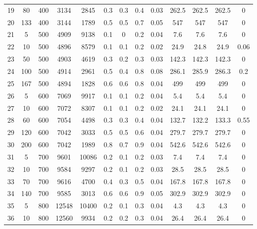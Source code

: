 \documentclass[11pt]{article}
\newcommand{\np}{\newpage}
\begin{document}
\begin{appendices}
\begin{landscape}
\begin{longtable}[c]{ccccc|cccc|cccc}
				19 & 80  & 400 & 3134  & 2845  & 0.3 & 0.3 & 0.4 & 0.03 & 262.5 & 262.5 & 262.5 & 0    \\
				20 & 133 & 400 & 3144  & 1789  & 0.5 & 0.5 & 0.7 & 0.05 & 547   & 547   & 547   & 0    \\ 
				\np
				\rowcolor[HTML]{EFEFEF} 
				21 & 5   & 500 & 4909  & 9138  & 0.1 & 0   & 0.2 & 0.04 & 7.6   & 7.6   & 7.6   & 0    \\
				\rowcolor[HTML]{EFEFEF} 
				22 & 10  & 500 & 4896  & 8579  & 0.1 & 0.1 & 0.2 & 0.02 & 24.9  & 24.8  & 24.9  & 0.06 \\
				\rowcolor[HTML]{EFEFEF} 
				23 & 50  & 500 & 4903  & 4619  & 0.3 & 0.2 & 0.3 & 0.03 & 142.3 & 142.3 & 142.3 & 0    \\
				\rowcolor[HTML]{EFEFEF} 
				24 & 100 & 500 & 4914  & 2961  & 0.5 & 0.4 & 0.8 & 0.08 & 286.1 & 285.9 & 286.3 & 0.2  \\
				\rowcolor[HTML]{EFEFEF} 
				25 & 167 & 500 & 4894  & 1828  & 0.6 & 0.6 & 0.8 & 0.04 & 499   & 499   & 499   & 0    \\
				26 & 5   & 600 & 7069  & 9917  & 0.1 & 0.1 & 0.2 & 0.04 & 5.4   & 5.4   & 5.4   & 0    \\
				27 & 10  & 600 & 7072  & 8307  & 0.1 & 0.1 & 0.2 & 0.02 & 24.1  & 24.1  & 24.1  & 0    \\
				28 & 60  & 600 & 7054  & 4498  & 0.3 & 0.3 & 0.4 & 0.04 & 132.7 & 132.2 & 133.3 & 0.55 \\
				29 & 120 & 600 & 7042  & 3033  & 0.5 & 0.5 & 0.6 & 0.04 & 279.7 & 279.7 & 279.7 & 0    \\
				30 & 200 & 600 & 7042  & 1989  & 0.8 & 0.7 & 0.9 & 0.04 & 542.6 & 542.6 & 542.6 & 0    \\
				\rowcolor[HTML]{EFEFEF} 
				31 & 5   & 700 & 9601  & 10086 & 0.2 & 0.1 & 0.2 & 0.03 & 7.4   & 7.4   & 7.4   & 0    \\
				\rowcolor[HTML]{EFEFEF} 
				32 & 10  & 700 & 9584  & 9297  & 0.2 & 0.1 & 0.2 & 0.03 & 28.5  & 28.5  & 28.5  & 0    \\
				\rowcolor[HTML]{EFEFEF} 
				33 & 70  & 700 & 9616  & 4700  & 0.4 & 0.3 & 0.5 & 0.04 & 167.8 & 167.8 & 167.8 & 0    \\
				\rowcolor[HTML]{EFEFEF} 
				34 & 140 & 700 & 9585  & 3013  & 0.6 & 0.6 & 0.9 & 0.05 & 302.9 & 302.9 & 302.9 & 0    \\
				35 & 5   & 800 & 12548 & 10400 & 0.2 & 0.1 & 0.3 & 0.04 & 4.3   & 4.3   & 4.3   & 0    \\
				36 & 10  & 800 & 12560 & 9934  & 0.2 & 0.2 & 0.3 & 0.04 & 26.4  & 26.4  & 26.4  & 0    \\

\end{longtable}
\end{landscape}
\end{appendices}
\end{document}
